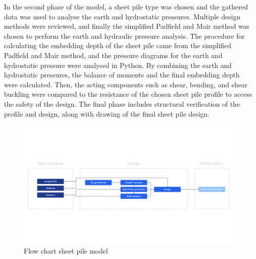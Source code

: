 In the second phase of the model, a sheet pile type was chosen and the gathered data was used to analyse the earth and hydrostatic pressures. Multiple design methods were reviewed, and finally the simplified Padfield and Mair method was chosen to perform the earth and hydraulic pressure analysis. The procedure for calculating the embedding depth of the sheet pile came from the simplified Padfield and Mair method, and the pressure diagrams for the earth and hydrostatic pressure were analysed in Python. By combining the earth and hydrostatic pressures, the balance of moments and the final embedding depth were calculated. Then, the acting components such as shear, bending, and shear buckling were compared to the resistance of the chosen sheet pile profile to access the safety of the design. The final phase includes structural verification of the profile and design, along with drawing of the final sheet pile design.

\begin{landscape}
\thispagestyle{empty}
    \begin{figure}[H]
        \centering
        \includegraphics[width=1.2\linewidth]{figures/ch3/FlowChart Structural (4).png}
        \caption{Flow chart sheet pile model}
        \label{fig:flow_chart}
    \end{figure}
\end{landscape}